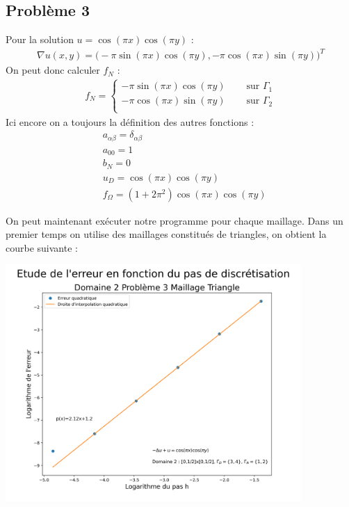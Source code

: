 \documentclass[a4paper, 12pt, french]{report}
\begin{document}
\subsection{Problème 3}
Pour la solution $u=\cos(\pi x)\cos(\pi y)$ :\\
\begin{align*}
    \nabla u(x,y) = \Big( -\pi\sin(\pi x)\cos(\pi y) , -\pi\cos(\pi x)\sin(\pi y) \Big)^T
\end{align*}
On peut donc calculer $f_N$ :
\begin{align*}
    f_N = \left\{
    \begin{array}{ll}
        -\pi\sin(\pi x)\cos(\pi y)  \quad &\text{ sur $\Gamma_1$}\\
        -\pi\cos(\pi x)\sin(\pi y)\quad &\text{ sur $\Gamma_2$}\\
    \end{array}
    \right.
\end{align*}
Ici encore on a toujours la définition des autres fonctions :
\begin{align*}
    &a_{\alpha\beta} = \delta_{\alpha\beta}\\
    &a_{00} = 1\\
    &b_N = 0\\
    & u_D = \cos(\pi x) \cos(\pi y)\\
    & f_\Omega =(1+2\pi^2)\cos(\pi x)\cos(\pi y)
\end{align*}

On peut maintenant exécuter notre programme pour chaque maillage.
Dans un premier temps on utilise des maillages constitués de triangles, on obtient la courbe suivante :

\begin{center}
    \includegraphics[height=9cm]{../Images/Courbes_Erreurs/D2P3T.png}
\end{center}
\end{document}
